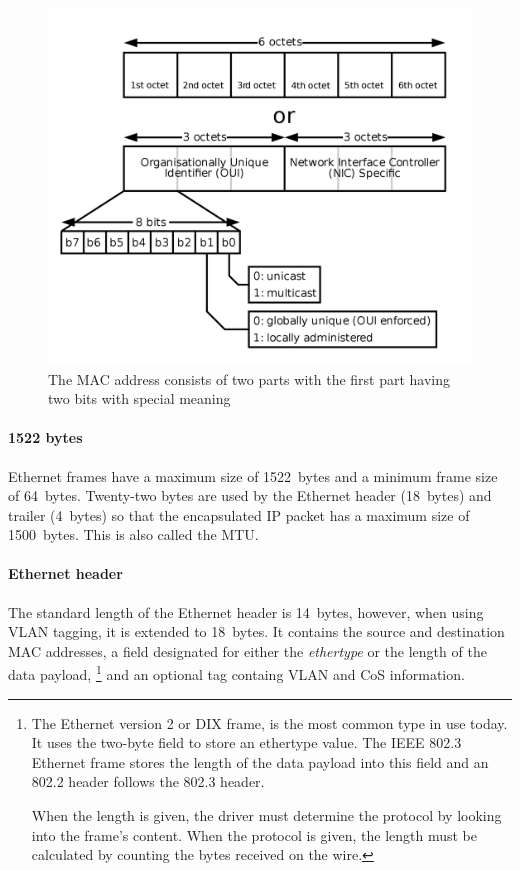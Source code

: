 \begin{figure}
\centering
\includegraphics[width=\textwidth]{images/ethernet/mac-address-format.png}
\caption[The format of a \acs{MAC} address]{The \acs{MAC} address consists of two parts with the first part having two bits with special meaning}
\label{fig:mac-format}
\end{figure}

\paragraph{1522 bytes}
Ethernet frames have a maximum size of 1522~bytes and a minimum frame size of 64~bytes.
Twenty-two bytes are used by the Ethernet header (18~bytes) and trailer (4~bytes) so that the encapsulated \acs{IP} packet has a maximum size of 1500~bytes.
This is also called the \acf{MTU}.


\paragraph{Ethernet header}
The standard length of the Ethernet header is 14~bytes, however, when using \acs{VLAN} tagging, it is extended to 18~bytes.
It contains the source and destination \acs{MAC} addresses, a field designated for either the \emph{ethertype} or the length of the data payload,%
   \footnote{%
      The Ethernet version 2 or \acs{DIX} frame, is the most common type in use today.
      It uses the two-byte field to store an ethertype value.
      The \acs{IEEE} 802.3 Ethernet frame stores the length of the data payload into this field and an 802.2  header follows the 802.3 header.

      When the length is given, the driver must determine the protocol by looking into the frame's content.
      When the protocol is given, the length must be calculated by counting the bytes received on the wire.
   }
and an optional  tag containg \acs{VLAN} and \acs{CoS} information.


